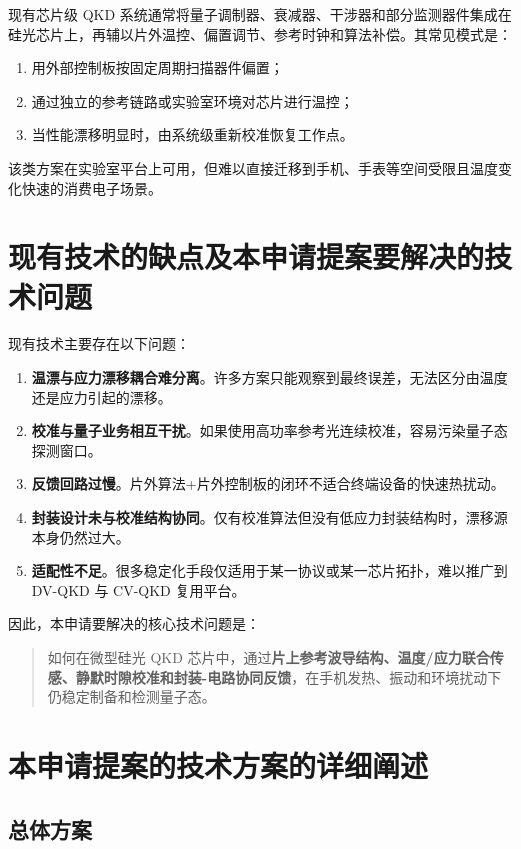 \documentclass[12pt,a4paper]{article}
\begin{document}
现有芯片级 QKD 系统通常将量子调制器、衰减器、干涉器和部分监测器件集成在硅光芯片上，再辅以片外温控、偏置调节、参考时钟和算法补偿。其常见模式是：
\begin{enumerate}[label=(\arabic*)]
    \item 用外部控制板按固定周期扫描器件偏置；
    \item 通过独立的参考链路或实验室环境对芯片进行温控；
    \item 当性能漂移明显时，由系统级重新校准恢复工作点。
\end{enumerate}

该类方案在实验室平台上可用，但难以直接迁移到手机、手表等空间受限且温度变化快速的消费电子场景。

\section{现有技术的缺点及本申请提案要解决的技术问题}

现有技术主要存在以下问题：
\begin{enumerate}[label=(\arabic*)]
    \item \textbf{温漂与应力漂移耦合难分离}。许多方案只能观察到最终误差，无法区分由温度还是应力引起的漂移。
    \item \textbf{校准与量子业务相互干扰}。如果使用高功率参考光连续校准，容易污染量子态探测窗口。
    \item \textbf{反馈回路过慢}。片外算法+片外控制板的闭环不适合终端设备的快速热扰动。
    \item \textbf{封装设计未与校准结构协同}。仅有校准算法但没有低应力封装结构时，漂移源本身仍然过大。
    \item \textbf{适配性不足}。很多稳定化手段仅适用于某一协议或某一芯片拓扑，难以推广到 DV-QKD 与 CV-QKD 复用平台。
\end{enumerate}

因此，本申请要解决的核心技术问题是：
\begin{quote}
如何在微型硅光 QKD 芯片中，通过\textbf{片上参考波导结构、温度/应力联合传感、静默时隙校准和封装-电路协同反馈}，在手机发热、振动和环境扰动下仍稳定制备和检测量子态。
\end{quote}

\section{本申请提案的技术方案的详细阐述}

\subsection{总体方案}
\end{document}
